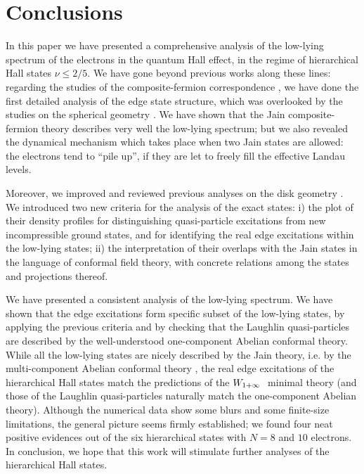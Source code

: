 
\section{Conclusions}

In this paper we have presented a comprehensive analysis
of the low-lying spectrum of the electrons in the quantum Hall effect,
in the regime of hierarchical Hall states $\nu\le 2/5$.
We have gone beyond previous works along these
lines: regarding the studies of the composite-fermion correspondence
\cite{deja} \cite{jain}, we have done the first detailed analysis 
of the edge state structure, which was overlooked by the studies on
the spherical geometry \cite{jj}\cite{jaka}. 
We have shown that the Jain composite-fermion theory describes very well
the low-lying spectrum; but we also revealed the dynamical mechanism 
which takes place when two Jain states are allowed:
the electrons tend to ``pile up'', if they are
let to freely fill the effective Landau levels.

Moreover, we improved and reviewed previous analyses on the disk geometry
\cite{wen}\cite{deja}\cite{kaap}. We introduced two new criteria
for the analysis of the exact states: 
i) the plot of their density profiles for distinguishing quasi-particle
excitations from new incompressible ground states, and for identifying the
real edge excitations within the low-lying states;
ii) the interpretation of their overlaps with the Jain states in the 
language of conformal field theory, with concrete relations among
the states and projections thereof.

We have presented a consistent analysis of the low-lying spectrum.
We have shown that the edge excitations form specific subset of 
the low-lying states, by applying the previous criteria and by
checking that the Laughlin quasi-particles are 
described by the well-understood 
one-component Abelian conformal theory.
While all the low-lying states are nicely described by the Jain theory, 
i.e. by the multi-component Abelian conformal theory
\cite{wen}\cite{juerg}\cite{read}, 
the real edge excitations of the hierarchical Hall states 
match the predictions of the $W_{1+\infty}\ $ minimal theory \cite{ctz5}
(and those of the Laughlin quasi-particles naturally 
match the one-component Abelian theory).
Although the numerical data show some blurs and some finite-size
limitations, the general picture seems firmly established;
we found four neat positive evidences out of the six hierarchical states
with $N=8$ and $10$ electrons.
In conclusion, we hope that this work will stimulate further analyses of
the hierarchical Hall states.


